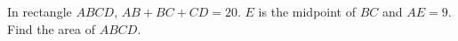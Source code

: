 In rectangle $ABCD$, $AB+BC+CD=20$. $E$ is the midpoint of $BC$ and $AE=9$. Find the area of $ABCD$.
